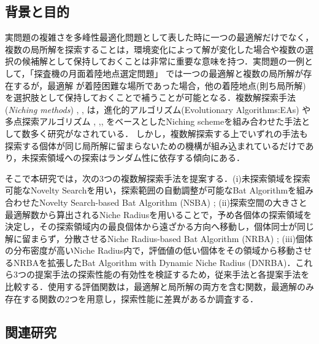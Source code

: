 \documentclass[a4j,11pt]{jarticle}
\begin{document}
\subsection{背景と目的}
実問題の複雑さを多峰性最適化問題として表した時に一つの最適解だけでなく，複数の局所解を探索することは，環境変化によって解が変化した場合や複数の選択の候補解として保持しておくことは非常に重要な意味を持つ．実問題の一例として，「探査機の月面着陸地点選定問題」\cite{ECCompetition} では一つの最適解と複数の局所解が存在するが，最適解
が着陸困難な場所であった場合，他の着陸地点(則ち局所解)を選択肢として保持しておくことで補うことが可能となる．複数解探索手法({\it Niching methods}) \cite{dADE}, \cite{nea}, \cite{CDE} は，進化的アルゴリズム(Evolutionary Algorithms:EAs) \cite{GA} や多点探索アルゴリズム \cite{CMA-ES}, \cite{PSO},\cite{DE}, \cite{BA} をベースとしたNiching schemeを組み合わせた手法として数多く研究がなされている．
しかし，複数解探索する上でいずれの手法も探索する個体が同じ局所解に留まらないための機構が組み込まれているだけであり，未探索領域への探索はランダム性に依存する傾向にある．

そこで本研究では，次の3つの複数解探索手法を提案する．(i)未探索領域を探索可能なNovelty Searchを用い，探索範囲の自動調整が可能なBat Algorithmを組み合わせたNovelty Search-based Bat Algorithm (NSBA) \cite{NSBA}; (ii)探索空間の大きさと最適解数から算出されるNiche Radiusを用いることで，予め各個体の探索領域を決定し，その探索領域内の最良個体から遠ざかる方向へ移動し，個体同士が同じ解に留まらず，分散させるNiche Radius-based Bat Algorithm (NRBA) \cite{NRBA}; (iii)個体の分布密度が高いNiche Radius内で，評価値の低い個体をその領域から移動させるNRBAを拡張したBat Algorithm with Dynamic Niche Radius (DNRBA)．これら3つの提案手法の探索性能の有効性を検証するため，従来手法と各提案手法を比較する．使用する評価関数は，最適解と局所解の両方を含む関数，最適解のみ存在する関数の2つを用意し，探索性能に差異があるか調査する．


\subsection{関連研究}
\end{document}
